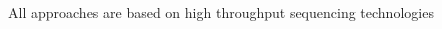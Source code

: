 \documentclass[10pt]{beamer}
\begin{document}
\begin{frame}
\begin{overlayarea}{\textwidth}{0.95\textheight}
{\begin{center}
				\vspace{-5cm}
				\begin{columns}
					\begin{column}{0.3\textwidth}
					\end{column}
					\begin{column}{0.3\textwidth}
						\begin{center}						
						\begin{alertblock}{}
						\begin{center}
							All approaches are based on high throughput sequencing technologies					
						\end{center}					
						\end{alertblock}
						\end{center}
					\end{column}	
					\begin{column}{0.4\textwidth}
					\end{column}
				\end{columns}			
			\end{center}}%
	\end{overlayarea}		
\end{frame}
\end{document}
